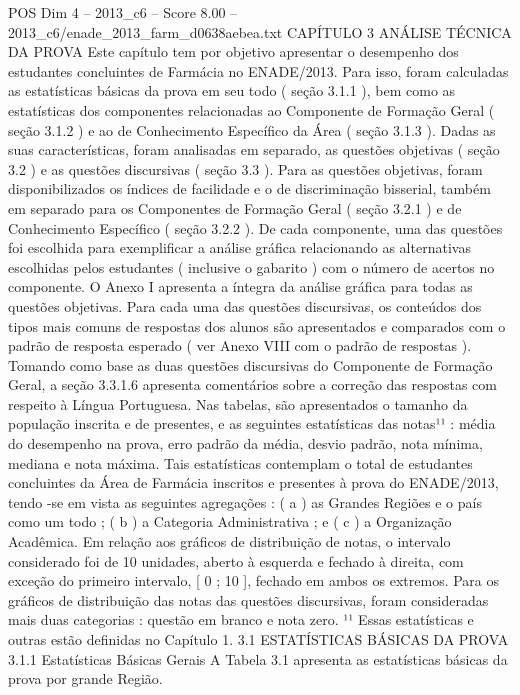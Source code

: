 \begin{textsample}{POS Dim 4 – 2013\_c6 – Score 8.00 – 2013\_c6/enade\_2013\_farm\_d0638aebea.txt}  \label{ex:f4_pos_050}
CAPÍTULO 3 ANÁLISE TÉCNICA DA PROVA Este capítulo tem por objetivo apresentar o desempenho dos estudantes concluintes de Farmácia no ENADE/2013.
Para isso, foram calculadas as estatísticas básicas da prova em seu todo ( seção 3.1.1 ), bem como as estatísticas dos componentes relacionadas ao Componente de Formação Geral ( seção 3.1.2 ) e ao de Conhecimento Específico da Área ( seção 3.1.3 ).
Dadas as suas características, foram analisadas em separado, as questões objetivas ( seção 3.2 ) e as questões discursivas ( seção 3.3 ).
Para as questões objetivas, foram disponibilizados os índices de facilidade e o de discriminação bisserial, também em separado para os Componentes de Formação Geral ( seção 3.2.1 ) e de Conhecimento Específico ( seção 3.2.2 ).
De cada componente, uma das questões foi escolhida para exemplificar a análise gráfica relacionando as alternativas escolhidas pelos estudantes ( inclusive o gabarito ) com o número de acertos no componente.
O Anexo I apresenta a íntegra da análise gráfica para todas as questões objetivas.
Para cada uma das questões discursivas, os conteúdos dos tipos mais comuns de respostas dos alunos são apresentados e comparados com o padrão de resposta esperado ( ver Anexo VIII com o padrão de respostas ).
Tomando como base as duas questões discursivas do Componente de Formação Geral, a seção 3.3.1.6 apresenta comentários sobre a correção das respostas com respeito à Língua Portuguesa.
Nas tabelas, são apresentados o tamanho da população inscrita e de presentes, e as seguintes estatísticas das notas¹¹ : média do desempenho na prova, erro padrão da média, desvio padrão, nota mínima, mediana e nota máxima.
Tais estatísticas contemplam o total de estudantes concluintes da Área de Farmácia inscritos e presentes à prova do ENADE/2013, tendo -se em vista as seguintes agregações : ( a ) as Grandes Regiões e o país como um todo ; ( b ) a Categoria Administrativa ; e ( c ) a Organização Acadêmica.
Em relação aos gráficos de distribuição de notas, o intervalo considerado foi de 10 unidades, aberto à esquerda e fechado à direita, com exceção do primeiro intervalo, [ 0 ; 10 ], fechado em ambos os extremos.
Para os gráficos de distribuição das notas das questões discursivas, foram consideradas mais duas categorias : questão em branco e nota zero. ¹¹ Essas estatísticas e outras estão definidas no Capítulo 1. 3.1 ESTATÍSTICAS BÁSICAS DA PROVA 3.1.1 Estatísticas Básicas Gerais A Tabela 3.1 apresenta as estatísticas básicas da prova por grande Região.

\end{textsample}
